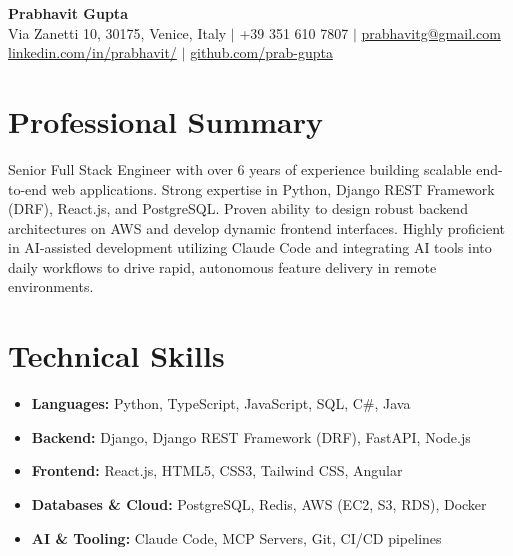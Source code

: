\documentclass[11pt,a4paper]{article}
\begin{document}
\begin{center}
    {\Huge \textbf{Prabhavit Gupta}} \\
    \vspace{2mm}
    Via Zanetti 10, 30175, Venice, Italy $\vert$ +39 351 610 7807 $\vert$ \href{mailto:prabhavitg@gmail.com}{prabhavitg@gmail.com} \\
    \href{https://www.linkedin.com/in/prabhavit/}{linkedin.com/in/prabhavit/} $\vert$ \href{https://github.com/prab-gupta}{github.com/prab-gupta}
\end{center}

\vspace{5mm}
\section*{Professional Summary}
Senior Full Stack Engineer with over 6 years of experience building scalable end-to-end web applications. Strong expertise in Python, Django REST Framework (DRF), React.js, and PostgreSQL. Proven ability to design robust backend architectures on AWS and develop dynamic frontend interfaces. Highly proficient in AI-assisted development utilizing Claude Code and integrating AI tools into daily workflows to drive rapid, autonomous feature delivery in remote environments.

\section*{Technical Skills}
\begin{itemize}[leftmargin=*]
    \item \textbf{Languages:} Python, TypeScript, JavaScript, SQL, C\#, Java
    \item \textbf{Backend:} Django, Django REST Framework (DRF), FastAPI, Node.js
    \item \textbf{Frontend:} React.js, HTML5, CSS3, Tailwind CSS, Angular
    \item \textbf{Databases \& Cloud:} PostgreSQL, Redis, AWS (EC2, S3, RDS), Docker
    \item \textbf{AI \& Tooling:} Claude Code, MCP Servers, Git, CI/CD pipelines
\end{itemize}
\end{document}

